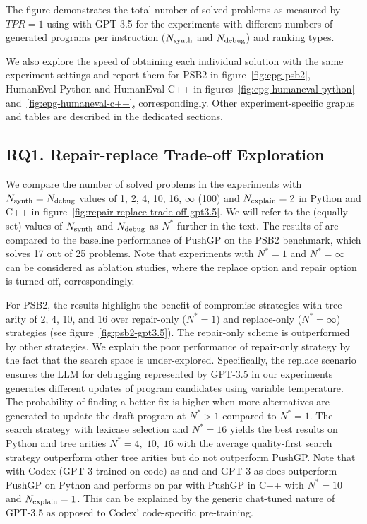 The figure demonstrates the total number of solved problems as measured by $TPR=1$ using \method{} with GPT-3.5 for the experiments with different numbers of generated programs per instruction ($N_\text{synth}$ and $N_\text{debug}{}$) and ranking types.

We also explore the speed of obtaining each individual solution with the same experiment settings and report them for PSB2 in figure~\ref{fig:epg-psb2}, HumanEval-Python and HumanEval-C++ in figures~\ref{fig:epg-humaneval-python} and~\ref{fig:epg-humaneval-c++}, correspondingly.
Other experiment-specific graphs and tables are described in the dedicated sections. 


\subsection{RQ1. Repair-replace Trade-off Exploration}
\label{sec:rq1}

We compare the number of solved problems in the experiments with $N_\text{synth}{}=N_\text{debug}{}$ values of 1, 2, 4, 10, 16, $\infty$ (100) and $N_\text{explain}{}=2$ in Python and C++ in figure~\ref{fig:repair-replace-trade-off-gpt3.5}. 
We will refer to the (equally set) values of $N_\text{synth}{}$ and $N_\text{debug}{}$ as $N^*$ further in the text.
The results of \method{} are compared to the baseline performance of PushGP on the PSB2 benchmark, which solves 17 out of 25 problems. 
Note that experiments with $N^*=1$ and $N^*=\infty$ can be considered as ablation studies, where the replace option and repair option is turned off, correspondingly. 

For PSB2, the results highlight the benefit of compromise strategies with tree arity of 2, 4, 10, and 16 over repair-only ($N^*=1$) and replace-only ($N^*=\infty$) strategies (see figure~\ref{fig:psb2-gpt3.5}). 
The repair-only scheme is outperformed by other strategies. 
We explain the poor performance of repair-only strategy by the fact that the search space is under-explored. 
Specifically, the replace scenario ensures the LLM for debugging represented by GPT-3.5 in our experiments generates different updates of program candidates using variable temperature.
The probability of finding a better fix is higher when more alternatives are generated to update the draft program at $N^*>1$ compared to $N^*=1$. 
The search strategy with lexicase selection and $N^*=16$ yields the best results on Python and tree arities  $N^*=4, \; 10, \; 16$ with the average quality-first search strategy outperform other tree arities but do not outperform PushGP.
Note that \method{} with Codex (GPT-3 trained on code) as \synthmodel{} and \debugmodel{} and GPT-3 as \textmodel{} does outperform PushGP on Python and performs on par with PushGP in C++ with $N^*=10$ and $N_\text{explain}{}=1$. %
This can be explained by the generic chat-tuned nature of GPT-3.5 as opposed to Codex' code-specific pre-training. 

